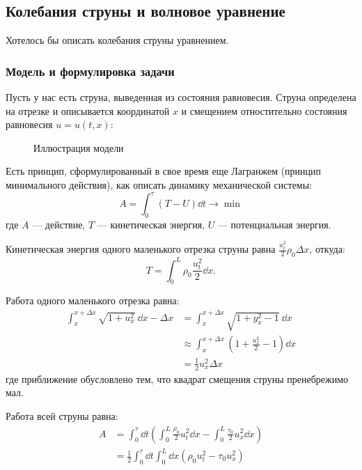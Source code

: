 \subsection{Колебания струны и волновое уравнение}

Хотелось бы описать колебания струны уравнением.

\subsubsection{Модель и формулировка задачи}

Пусть у нас есть струна, выведенная из состояния равновесия. Струна определена на отрезке и описывается координатой $x$ и смещением отностительно состояния равновесия $u = u(t, x)$:
%
\begin{figure}[ht]
  \centering
  \caption{Иллюстрация модели}
\end{figure}

Есть принцип, сформулированный в свое время еще Лагранжем (принцип минимального действия), как описать динамику механической системы:
\begin{equation}
  A = \int_0^\tau (T - U) \dd t \longrightarrow \min
\end{equation}
где $A$ --- действие, $T$ --- кинетическая энергия, $U$ --- потенциальная энергия.

Кинетическая энергия одного маленького отрезка струны равна $\frac{u_t^2}{2} \rho_0 \Delta x$, откуда:
\begin{equation}
  T = \int_0^L \rho_0 \frac{u_t^2}{2} \dd x.
\end{equation}

Работа одного маленького отрезка равна:
%
\begin{equation}
  \begin{aligned}
  \int_x^{x + \Delta x} \sqrt{1 + u_x^2}\ \dd x - \Delta x &= \int_x^{x + \Delta x} \sqrt{1 + y_x^2 - 1}\ \dd x \\
  &\approx \int_x^{x + \Delta x} \left(1 + \frac{u_x^2}{2} - 1\right) \dd x \\
  &= \frac{1}{2} u_x^2 \Delta x
  \end{aligned}
\end{equation}
где приближение обусловлено тем, что квадрат смещения струны пренебрежимо мал.

Работа всей струны равна:
%
\begin{equation}
  \begin{aligned}
    A &= \int_0^\tau \dd t \left(\int_0^L \frac{\rho_0}{2} u_t^2 \dd x - \int_0^L \frac{\tau_0}{2} u_x^2 \dd x \right) \\
    &= \frac{1}{2} \int_0^\tau \dd t \int_0^L \dd x \left(\rho_0 u_t^2 - \tau_0 u_x^2 \right)
  \end{aligned}
\end{equation}